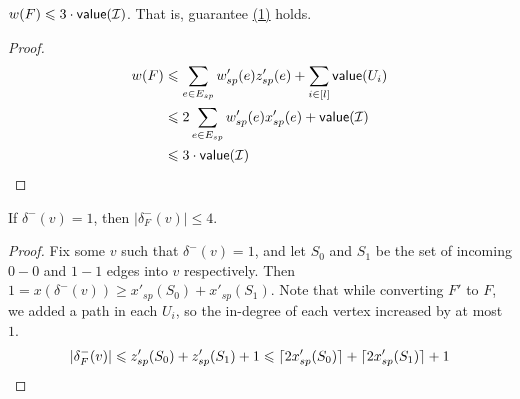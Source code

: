 \documentclass[./main.tex]{subfiles}
\DeclarePairedDelimiter\ceil{\lceil}{\rceil}
\begin{document}
		\begin{claim}
			$w(F) \leqslant 3\cdot\textsf{\textup{value}}(\mathcal{I})$. That is, guarantee \hyperref[lemm:main:1]{(1)} holds.
		\end{claim}
		\begin{proof}
			\begin{align*}
				w(F) &\leqslant \sum_{e \in E_{sp}} w'_{sp}(e)z'_{sp}(e) + \sum_{i \in [l]} \textsf{\textup{value}}(U_i)\\
				 &\leqslant 2\sum_{e\in E_{sp}}w'_{sp}(e)x'_{sp}(e) + \textsf{\textup{value}}(\mathcal{I})\\
			 	&\leqslant 3\cdot\textsf{\textup{value}}(\mathcal{I})
			\end{align*}
		\end{proof}
		\begin{claim}
			If $\delta^-(v) = 1$, then $|\delta^-_F(v)|\leq 4$.
		\end{claim}
		\begin{proof}
			Fix some $v$ such that $\delta^-(v) = 1$, and let $S_0$ and $S_1$ be the set of incoming $0-0$ and $1-1$ edges into $v$ respectively. Then $1=x(\delta^-(v))\geq x'_{sp}(S_0) + x'_{sp}(S_1)$. Note that while converting $F'$ to $F$, we added a path in each $U_i$, so the in-degree of each vertex increased by at most $1$.
			\[
				|\delta^-_F(v)| \leqslant z'_{sp}(S_0) + z'_{sp}(S_1) + 1\leqslant \ceil{2x'_{sp}(S_0)} + \ceil{2x'_{sp}(S_1)} + 1
			\]
		\end{proof}
\end{document}
